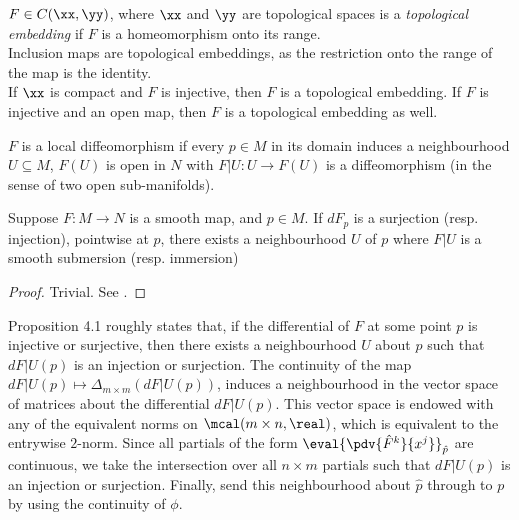 \documentclass[../main-v2-manifolds.tex]{subfiles}
\begin{document}
\begin{definition}\label{lee-chp4:topological-embedding}
    $F\in C(\xx,\yy)$, where $\xx$ and $\yy$ are topological spaces is a \emph{topological embedding} if $F$ is a homeomorphism onto its range.\\

    Inclusion maps are topological embeddings, as the restriction onto the range of the map is the identity.\\

    If $\xx$ is compact and $F$ is injective, then $F$ is a topological embedding. If $F$ is injective and an open map, then $F$ is a topological embedding as well.
\end{definition}

\begin{definition}\label{lee-chp4:topological-submersion}
    
\end{definition}

\begin{definition}\label{lee-chp4:local-diffeomorphism-definition}
    $F$ is a local diffeomorphism if every $p\in M$ in its domain induces a neighbourhood $U\subseteq M$, $F(U)$ is open in $N$ with $F|U:U\to F(U)$ is a diffeomorphism (in the sense of two open sub-manifolds).
\end{definition}

\begin{wts}\label{lee-chp4:rank-open-condition-prop-4.1}
    Suppose $F: M\to N$ is a smooth map, and $p\in M$. If $dF_p$ is a surjection (resp. injection), pointwise at $p$, there exists a neighbourhood $U$ of $p$ where $F|U$ is a smooth submersion (resp. immersion)
\end{wts}
\begin{proof}
    Trivial. See .
\end{proof}
Proposition 4.1 roughly states that, if the differential of $F$ at some point $p$ is injective or surjective, then there exists a neighbourhood $U$ about $p$ such that $dF|U(p)$ is an injection or surjection. The continuity of the map $dF|U(p) \mapsto \Delta_{m\times m}(dF|U(p))$, induces a neighbourhood in the vector space of matrices about the differential $dF|U(p)$. This vector space is endowed with any of the equivalent norms on $\mcal(m\times n,\real)$, which is equivalent to the entrywise $2$-norm. Since all partials of the form $\eval{\pdv{\hat{F}^{k}}{x^j}}_{\hat{p}}$ are continuous, we take the intersection over all $n\times m$ partials such that $dF|U(p)$ is an injection or surjection. Finally, send this neighbourhood about $\hat{p}$ through to $p$ by using the continuity of $\phi$.
\end{document}
